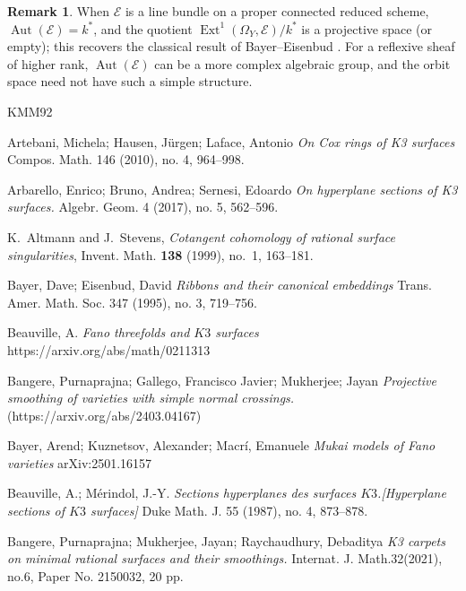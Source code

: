 \documentclass[11pt,twoside]{amsart}
\theoremstyle{plain}
\numberwithin{equation}{section}
\theoremstyle{definition}
\newtheorem{remark}[theorem]{Remark}
\newcommand{\cE}{\mathscr{E}}
\newcommand{\Ext}{\operatorname{Ext}}
\newcommand{\Aut}{\operatorname{Aut}}
\begin{document}
\begin{remark}
When $\cE$ is a line bundle on a proper connected reduced scheme,
$\Aut(\cE) = k^{*}$, and the quotient
$\Ext^1(\Omega_Y, \cE)/k^*$ is a projective space (or empty); this
recovers the classical result of Bayer--Eisenbud
\cite[Corollary~1.4]{BE95}. For a reflexive sheaf of higher rank,
$\Aut(\cE)$ can be a more complex algebraic group, and the orbit
space need not have such a simple structure.
\end{remark}


\begin{thebibliography}{KMM92}
\color{black}



Artebani, Michela; Hausen, Jürgen; Laface, Antonio
\emph{On Cox rings of K3 surfaces}
Compos. Math. 146 (2010), no. 4, 964–998.

Arbarello, Enrico; Bruno, Andrea; Sernesi, Edoardo
\emph{On hyperplane sections of K3 surfaces.}
Algebr. Geom. 4 (2017), no. 5, 562–596.


K.~Altmann and J.~Stevens,
\newblock \emph{Cotangent cohomology of rational surface singularities},
\newblock Invent. Math. \textbf{138} (1999), no.~1, 163--181.

Bayer, Dave; Eisenbud, David
\emph{Ribbons and their canonical embeddings}
Trans. Amer. Math. Soc. 347 (1995), no. 3, 719–756.


Beauville, A. \emph{Fano threefolds and $K3$ surfaces}
https://arxiv.org/abs/math/0211313

 Bangere, Purnaprajna; Gallego, Francisco Javier; Mukherjee; Jayan \emph{Projective smoothing of varieties with simple normal crossings.}(https://arxiv.org/abs/2403.04167)

Bayer, Arend;  Kuznetsov, Alexander;  Macr\'i, Emanuele 
\emph{Mukai models of Fano varieties}
arXiv:2501.16157

Beauville, A.; Mérindol, J.-Y.
\emph{Sections hyperplanes des surfaces $K3$.[Hyperplane sections of $K3$ surfaces]}
Duke Math. J. 55 (1987), no. 4, 873–878.

Bangere, Purnaprajna; Mukherjee, Jayan; Raychaudhury, Debaditya
\emph{K3 carpets on minimal rational surfaces and their smoothings.}
Internat. J. Math.32(2021), no.6, Paper No. 2150032, 20 pp.


\end{thebibliography}
\end{document}
